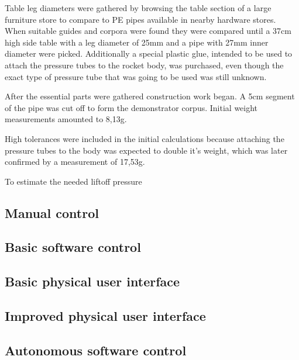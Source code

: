 Table leg diameters were gathered by browsing the table section of a large furniture store to compare to PE pipes available in nearby hardware stores. When suitable guides and corpora were found they were compared until a 37cm high side table with a leg diameter of 25mm and a pipe with 27mm inner diameter were picked. Additionally a special plastic glue, intended to be used to attach the pressure tubes to the rocket body, was purchased, even though the exact type of pressure tube that was going to be used was still unknown.

After the essential parts were gathered construction work began. A 5cm segment of the pipe was cut off to form the demonstrator corpus. Initial weight measurements amounted to 8,13g. 


High tolerances were included in the initial calculations because attaching the pressure tubes to the body was expected to double it's weight, which was later confirmed by a measurement of 17,53g.

To estimate the needed liftoff pressure 


\subsection{Manual control}


\subsection{Basic software control}


\subsection{Basic physical user interface}


\subsection{Improved physical user interface}


\subsection{Autonomous software control}